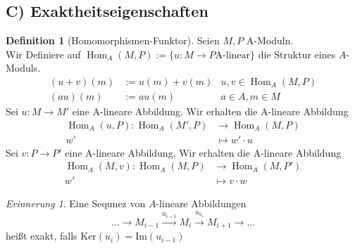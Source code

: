 \documentclass[10pt,a4paper]{article}
\newcommand{\Hom}{\operatorname{Hom}}
\newcounter{thm}[section]
\theoremstyle{definition}
\newtheorem{definition}[thm]{Definition}
\theoremstyle{plain}
\theoremstyle{remark}
\newtheorem{rem}[thm]{Erinnerung}
\begin{document}
\subsection*{C) Exaktheitseigenschaften}
\begin{definition}[Homomorphismen-Funktor]
	Seien $M,P$ A-Moduln.\\
	Wir Definiere auf $\Hom_A(M,P):=\{u:M\rightarrow P \text{A-linear}\}$ die Struktur eines $A$-Moduls.
	\begin{align*}
	(u+v)(m)&:=u(m)+v(m) &u,v\in\Hom_A(M,P)\\
	(au)(m)&:=au(m)		 &a\in A,m\in M
	\end{align*}
	Sei $u:M\rightarrow M'$ eine A-lineare Abbildung. Wir erhalten die A-lineare Abbildung
	\begin{align*}
	\Hom_A(u,P):\Hom_A(M',P)&\rightarrow \Hom_A(M,P)\\
	w'&\mapsto w'\cdot u
	\end{align*}
	Sei $v:P\rightarrow P'$ eine A-lineare Abbildung. Wir erhalten die A-lineare Abbildung
	\begin{align*}
	\Hom_A(M,v):\Hom_A(M,P)&\rightarrow \Hom_A(M,P')\\
	w'&\mapsto v\cdot w
	\end{align*}
\end{definition}

\begin{rem}
	Eine Sequnez von $A$-lineare Abbildungen\[...\rightarrow M_{i-1}\xrightarrow{u_{i-1}}M_i\xrightarrow{u_{u_i}}M_{i+1}\rightarrow ...\]
	heißt exakt, falls $\text{Ker}(u_i)=\text{Im}(u_{i-1})$
\end{rem}

\addtocounter{thm}{-1}
\end{document}
